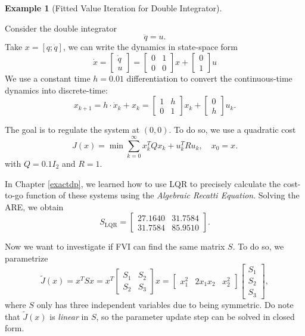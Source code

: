 \documentclass[
]{book}
\theoremstyle{definition}
\theoremstyle{definition}
\newtheorem{example}{Example}[chapter]
\theoremstyle{definition}
\theoremstyle{definition}
\theoremstyle{remark}
\begin{document}
\begin{example}[Fitted Value Iteration for Double Integrator]
\protect\hypertarget{exm:feature-double-integrator}{}\label{exm:feature-double-integrator}

Consider the double integrator
\[
\ddot{q} = u.
\]
Take \(x = [q;\dot{q}]\), we can write the dynamics in state-space form
\begin{equation}
    \dot{x} = \begin{bmatrix}
    \dot{q} \\
    u
    \end{bmatrix} = 
    \begin{bmatrix}
        0 & 1 \\
        0 & 0 
    \end{bmatrix} x + \begin{bmatrix}
        0 \\
        1 \end{bmatrix} u
    \label{eq:double-integrator-dynamics}
\end{equation}
We use a constant time \(h=0.01\) differentiation to convert the continuous-time dynamics into discrete-time:
\[
x_{k+1} = h \cdot \dot{x}_k + x_k = \begin{bmatrix} 1 & h \\ 0 & 1 \end{bmatrix} x_k + \begin{bmatrix} 0 \\ h \end{bmatrix} u_k.
\]

The goal is to regulate the system at \((0,0)\). To do so, we use a quadratic cost
\[
J(x) = \min \sum_{k=0}^{\infty} x_k^T Q x_k + u_k^T R u_k, \quad x_0 = x.
\]
with \(Q = 0.1I_2\) and \(R = 1\).

In Chapter \ref{exactdp}, we learned how to use LQR to precisely calculate the cost-to-go function of these systems using the \emph{Algebraic Recatti Equation}. Solving the ARE, we obtain
\[
S_{\mathrm{LQR}} = \begin{bmatrix} 27.1640 & 31.7584 \\ 31.7584 & 85.9510 \end{bmatrix}.
\]

Now we want to investigate if FVI can find the same matrix \(S\). To do so, we parametrize
\[
\tilde{J}(x) = x^T S x = x^T \begin{bmatrix} S_1 & S_2 \\ S_2 & S_3 \end{bmatrix} x = \begin{bmatrix} x_1^2 & 2 x_1 x_2 & x_2^2 \end{bmatrix} \begin{bmatrix} S_1 \\ S_2 \\ S_3 \end{bmatrix}, 
\]
where \(S\) only has three independent variables due to being symmetric. Do note that \(\tilde{J}(x)\) is \emph{linear} in \(S\), so the parameter update step can be solved in closed form.


\end{example}
\end{document}
